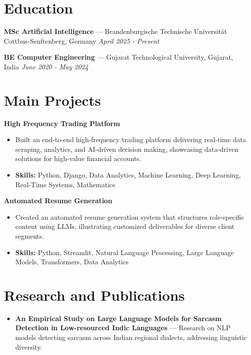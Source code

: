 \documentclass[a4paper,10pt]{article}
\begin{document}
\section*{Education}
\textbf{MSc Artificial Intelligence} — Brandenburgische Technische Universität Cottbus-Senftenberg, Germany \hfill \textit{April 2025 - Present}\par
\vspace{1.5pt}
\textbf{BE Computer Engineering} — Gujarat Technological University, Gujarat, India \hfill \textit{June 2020 - May 2024}\par

\section*{Main Projects}
\textbf{High Frequency Trading Platform}\par
\vspace{1pt}
\begin{itemize}
  \item Built an end-to-end high-frequency trading platform delivering real-time data scraping, analytics, and AI-driven decision making, showcasing data-driven solutions for high-value financial accounts.
  \item \textbf{Skills:} Python, Django, Data Analytics, Machine Learning, Deep Learning, Real-Time Systems, Mathematics
\end{itemize}
\vspace{3pt}
\textbf{Automated Resume Generation}\par
\vspace{1pt}
\begin{itemize}
  \item Created an automated resume generation system that structures role-specific content using LLMs, illustrating customized deliverables for diverse client segments.
  \item \textbf{Skills:} Python, Streamlit, Natural Language Processing, Large Language Models, Transformers, Data Analytics
\end{itemize}

\section*{Research and Publications}
\begin{itemize}
\item \textbf{An Empirical Study on Large Language Models for Sarcasm Detection in Low-resourced Indic Languages} — Research on NLP models detecting sarcasm across Indian regional dialects, addressing linguistic diversity.
\end{itemize}
\end{document}
